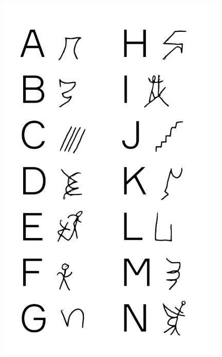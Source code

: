 \makeatletter\@openrightfalse
\begin{absolutelynopagebreak}
\begin{vplace}
\begin{figure}[H]
\begin{adjustwidth}{-0.99cm}{}
  \centering
  \vspace*{-2cm}
  \hspace*{0.4cm}
  \includegraphics[width=110mm]{./imgs/alfa3.pdf}  
  \hfill
\end{adjustwidth}

\thispagestyle{empty}

\end{figure}
\end{vplace}

\end{absolutelynopagebreak}

